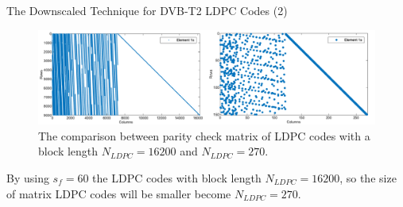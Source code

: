 \documentclass[11pt, aspectratio=169]{beamer}
\begin{document}
\begin{frame}{The Downscaled Technique for DVB-T2 LDPC Codes (2)}
\begin{figure}
\centering 
\includegraphics[scale=0.4]{gambarafa/compareH}
\caption{The comparison between parity check matrix of LDPC codes with a block length $N_{LDPC} = 16200$ and $N_{LDPC} = 270$.}
\label{sistemmodelMQCLDPC} %
\end{figure}

By using $s_f=60$ the LDPC codes with block length $N_{LDPC}=16200$, so the size of matrix LDPC codes will be smaller become $N_{LDPC}=270$.




\end{frame}
\end{document}
